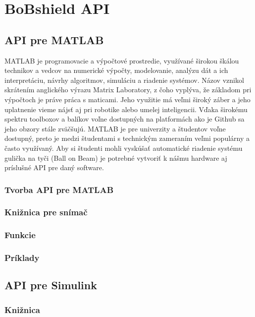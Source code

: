 \chapter{BoBshield API}
\label{kap:3}

\section{API pre MATLAB}
\label{kap:3.1}
MATLAB je programovacie a výpočtové prostredie, využívané širokou škálou technikov a vedcov na numerické výpočty, modelovanie, analýzu dát a ich interpretáciu, návrhy algoritmov, simuláciu a riadenie systémov. Názov vznikol skrátením anglického výrazu Matrix Laboratory, z čoho vyplýva, že základom pri výpočtoch je práve práca s maticami. Jeho využitie má veľmi široký záber a jeho uplatnenie vieme nájsť aj pri robotike alebo umelej inteligencii. Vďaka širokému spektru toolboxov a balíkov voľne dostupných na platformách ako je Github sa jeho obzory stále zväčšujú. MATLAB je pre univerzity a študentov voľne dostupný, preto je medzi študentami s technickým zameraním veľmi populárny a často využívaný. Aby si študenti mohli vyskúšať automatické riadenie systému gulička na tyči (Ball on Beam) je potrebné vytvoriť k nášmu hardware aj príslušné API pre daný software.  

\subsection{Tvorba API pre MATLAB}
\label{kap:3.1.1}

\subsection{Knižnica pre snímač}
\label{kap:3.1.2}

\subsection{Funkcie}
\label{kap:3.1.3}

\subsection{Príklady}
\label{kap:3.1.4}

\section{API pre Simulink}
\label{kap:3.2}

\subsection{Knižnica}
\label{kap:3.2.1}

